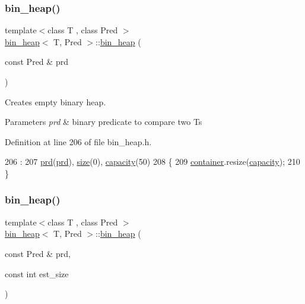 \subsubsection{\texorpdfstring{bin\+\_\+heap()}{bin\_heap()}\hspace{0.1cm}{\footnotesize\ttfamily [1/3]}}
{\footnotesize\ttfamily template$<$class T , class Pred $>$ \\
\mbox{\hyperlink{classbin__heap}{bin\+\_\+heap}}$<$ T, Pred $>$\+::\mbox{\hyperlink{classbin__heap}{bin\+\_\+heap}} (\begin{DoxyParamCaption}\item[{const Pred \&}]{prd }\end{DoxyParamCaption})}



Creates empty binary heap. 


\begin{DoxyParams}{Parameters}
{\em prd} & binary predicate to compare two {\ttfamily T}s \\
\hline
\end{DoxyParams}


Definition at line 206 of file bin\+\_\+heap.\+h.


\begin{DoxyCode}
206                                            :
207     \mbox{\hyperlink{classbin__heap_a5ecc420dfd03a6a0b4c9328cac1fae14}{prd}}(\mbox{\hyperlink{classbin__heap_a5ecc420dfd03a6a0b4c9328cac1fae14}{prd}}), \mbox{\hyperlink{classbin__heap_a8dde1008dcc24d734dbdb2c7ca50435b}{size}}(0), \mbox{\hyperlink{classbin__heap_ac5aa6948898bfc047cae2fe99ba28f57}{capacity}}(50)
208 \{
209     \mbox{\hyperlink{classbin__heap_a413200f4c6e24090c5e9a32184fc8857}{container}}.resize(\mbox{\hyperlink{classbin__heap_ac5aa6948898bfc047cae2fe99ba28f57}{capacity}});
210 \}
\end{DoxyCode}
\mbox{\label{classbin__heap_ab911dd559d9d9fd665b9fdf2d8202bb8}} 
\subsubsection{\texorpdfstring{bin\+\_\+heap()}{bin\_heap()}\hspace{0.1cm}{\footnotesize\ttfamily [2/3]}}
{\footnotesize\ttfamily template$<$class T , class Pred $>$ \\
\mbox{\hyperlink{classbin__heap}{bin\+\_\+heap}}$<$ T, Pred $>$\+::\mbox{\hyperlink{classbin__heap}{bin\+\_\+heap}} (\begin{DoxyParamCaption}\item[{const Pred \&}]{prd,  }\item[{const int}]{est\+\_\+size }\end{DoxyParamCaption})}



